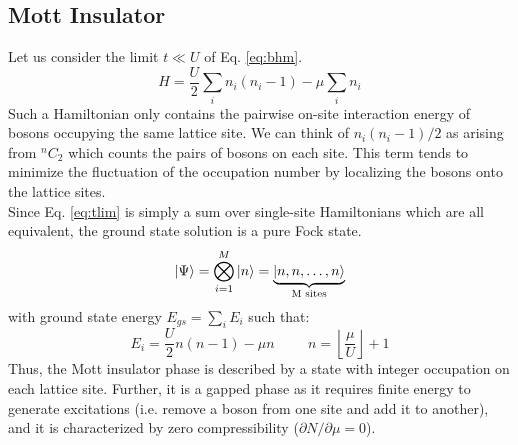 \subsection{Mott Insulator}
Let us consider the limit $t \ll U$ of Eq. \eqref{eq:bhm}.
\begin{equation}\label{eq:tlim}
    H = \frac{U}{2}\sum_i n_i(n_i - 1) - \mu \sum_i n_i
\end{equation}
Such a Hamiltonian only contains the pairwise on-site interaction energy of bosons occupying the same lattice site. We can think of $n_i(n_i - 1)/2$ as arising from ${}^n C_ 2$ which counts the pairs of bosons on each site. This term tends to minimize the fluctuation of the occupation number by localizing the bosons onto the lattice sites.
\vspace{0.5cm}\\
Since Eq. \eqref{eq:tlim} is simply a sum over single-site Hamiltonians which are all equivalent, the ground state solution is a pure Fock state. 
\begin{equation}
    \ket{\Psi} = \bigotimes_{i = 1}^{M} \ket{n} = \underbrace{\ket{n, n, \dots, n}}_{\text{M sites}}
\end{equation}
with ground state energy $E_{gs} = \sum_i E_i$ such that:
\begin{equation}
    E_i = \frac{U}{2}n(n - 1) - \mu n \hspace{1cm} n = \left \lfloor{\frac{\mu}{U}}\right \rfloor  + 1
\end{equation}
Thus, the Mott insulator phase is described by a state with integer occupation on each lattice site. Further, it is a gapped phase  as it requires finite energy to generate excitations (i.e. remove a boson from one site and add it to another), and it is characterized by zero compressibility ($\partial N/\partial \mu = 0$)\cite{Bloch_2008}.


